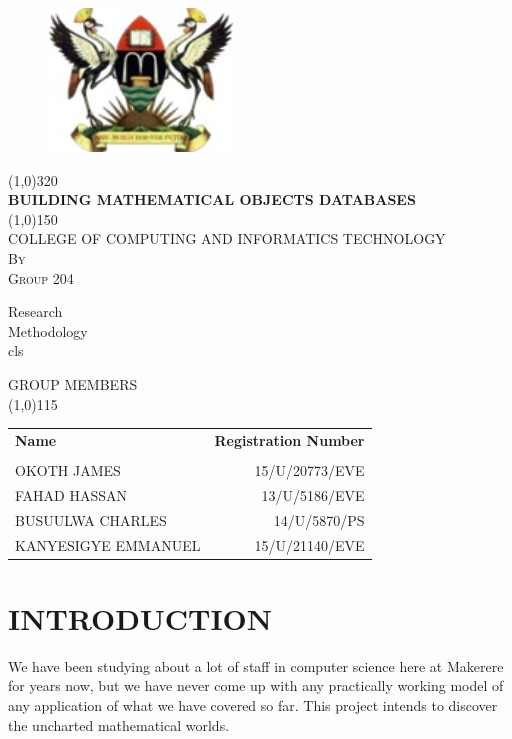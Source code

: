 \documentclass{article}
\begin{document}
\begin{titlepage}
	\begin{figure}
		\centering
		\includegraphics[height=1.5in]{muk.jpg}
	\end{figure}
	\begin{center}
		\line(1,0){320}\\
		[0.25in]
		\huge{\bfseries BUILDING MATHEMATICAL OBJECTS DATABASES}\\
		[2mm]
		\line(1,0){150}\\
		[1.2cm]
		\textsc{\large COLLEGE OF COMPUTING AND INFORMATICS TECHNOLOGY}\\
		[0.5cm]
		\textsc{\large By}\\
		[0.5cm]
		\textsc{\large Group 204}\\
		[4cm]
	\end{center}
	\begin{flushright}
	    Research\\
		Methodology\\
		cls\\
	\end{flushright}
\end{titlepage}
\thispagestyle{empty}
\centering
	\textsc{\large GROUP MEMBERS} \\
	\line(1,0){115}\\
	[0.25in]
\begin{table}[H]
	\centering
	\label{Tab:GroupMembers}
	\begin{tabular}{lr}
		\bfseries{Name} & \bfseries{Registration Number} \\ \\ 
		OKOTH JAMES         & 15/U/20773/EVE \\
		FAHAD HASSAN        & 13/U/5186/EVE \\
		BUSUULWA CHARLES    & 14/U/5870/PS \\   
		KANYESIGYE EMMANUEL & 15/U/21140/EVE \\
	\end{tabular}
\end{table}
\newpage
\thispagestyle{empty}
\cleardoublepage
\setcounter{page}{1}
\section{INTRODUCTION}\label{sec:intro}
We have been studying about a lot of staff in computer science here at Makerere for years now, but we have never come up with any practically working model of any application of what we have covered so far. This project intends to discover the uncharted mathematical worlds. \\
\end{document}
